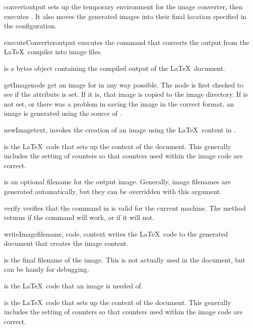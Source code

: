 \begin{methoddesc}[Imager]{convert}{output}
sets up the temporary environment for the image converter, then executes
.  It also moves the generated images into
their final location specified in the configuration.
\end{methoddesc}

\begin{methoddesc}[Imager]{executeConverter}{output}
executes the command that converts the output from the \LaTeX\ compiler
into image files.

 is a bytes object containing the compiled output of the
\LaTeX\ document.
\end{methoddesc}

\begin{methoddesc}[Imager]{getImage}{node}
get an image for  in any way possible.  The node is first checked
to see if the  attribute is set.  If it is, that 
image is copied to the image directory.  If  is
not set, or there was a problem in saving the image in the correct format,
an image is generated using the source of .
\end{methoddesc}

\begin{methoddesc}[Imager]{newImage}{text, }
invokes the creation of an image using the \LaTeX\ content in .

 is the \LaTeX\ code that sets up the context of the document.
This generally includes the setting of counters so that counters used
within the image code are correct.

 is an optional filename for the output image.  Generally, 
image filenames are generated automatically, but they can be overridden
with this argument.
\end{methoddesc}

\begin{methoddesc}[Imager]{verify}{}
verifies that the command in  is valid for the current
machine.  The  method returns  if the command will
work, or  if it will not.
\end{methoddesc}

\begin{methoddesc}[Imager]{writeImage}{filename, code, context}
writes the \LaTeX\ code to the generated document that creates the 
image content.

 is the final filename of the image.  This is not actually
used in the document, but can be handy for debugging.

 is the \LaTeX\ code that an image is needed of.

 is the \LaTeX\ code that sets up the context of the document.
This generally includes the setting of counters so that counters used
within the image code are correct.
\end{methoddesc}


